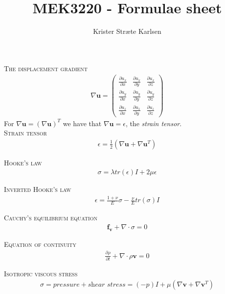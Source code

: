 \documentclass[11pt,a4paper,english]{article}
\title{MEK3220 - Formulae sheet}
\author{Krister Stræte Karlsen}
\begin{document}
\maketitle

{\scshape The displacement gradient} 
\begin{align*}
\nabla \mathbf{u} = 
\begin{pmatrix}	    \frac{\partial u_x}{ \partial x} & \frac{\partial u_x}{ \partial y} & \frac{\partial u_x}{ \partial z}      \\
                		\frac{\partial u_y}{ \partial x} & \frac{\partial u_y}{ \partial y} & \frac{\partial u_y}{ \partial z}     \\
               	 	\frac{\partial u_z}{ \partial x} & \frac{\partial u_z}{ \partial y} &\frac{\partial u_z}{ \partial z}     
\end{pmatrix}
\end{align*}
\hspace{1cm} For $ \nabla \mathbf{u} =  ( \nabla \mathbf{u})^T  $ we have that $\nabla \mathbf{u} = \epsilon $, the \emph{strain tensor}.\\

{\scshape Strain tensor} 
\begin{align*}
\epsilon = \frac{1}{2}(\nabla \mathbf{u} + \nabla \mathbf{u}^T  ) 
\end{align*}

{\scshape Hooke's law} 
\begin{align*}
\sigma  = \lambda tr(\epsilon) I + 2\mu \epsilon 
\end{align*}

{\scshape Inverted Hooke's law} 
\begin{align*}
\epsilon = \frac{1+\nu}{E}\sigma - \frac{\nu}{E} tr(\sigma)I   
\end{align*}

{\scshape Cauchy's equilibrium equation} 
\begin{align*}
\mathbf{f_v} + \nabla \cdot \sigma = 0
\end{align*}

{\scshape Equation of continuity} 
\begin{align*}
\frac{\partial \rho}{\partial t} + \nabla \cdot  \rho \mathbf{v} = 0
\end{align*}

{\scshape Isotropic viscous stress} 
\begin{align*}
\sigma = pressure + \textit{shear stress} =  (-p)I + \mu (\nabla \mathbf{v}  + \nabla \mathbf{v}^T  )
\end{align*}
\end{document}

